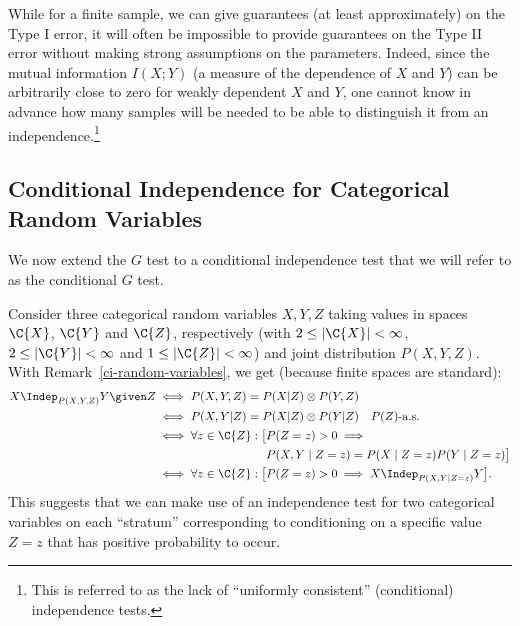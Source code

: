 While for a finite sample, we can give guarantees (at least approximately) on the Type I error, it will often be
impossible to provide guarantees on the Type II error without making strong
assumptions on the parameters. Indeed, since the mutual information $I(X;Y)$ (a measure of
the dependence of $X$ and $Y$) can be arbitrarily close to zero for weakly dependent $X$ 
and $Y$, one cannot know in advance how many samples will be needed to be able to distinguish
it from an independence.\footnote{This is referred to as the lack of ``uniformly consistent''
(conditional) independence tests.}

\subsection{Conditional Independence for Categorical Random Variables}

We now extend the $G$ test to a conditional independence test that we will refer to as the conditional $G$ test.

Consider three categorical random variables $X,Y,Z$ taking values in spaces $\C{X}$, $\C{Y}$
and $\C{Z}$, respectively (with $2 \le |\C{X}| < \infty$, $2 \le |\C{Y}| < \infty$ and $1 \le |\C{Z}| < \infty$) and joint distribution $P(X,Y,Z)$.
With Remark~\ref{ci-random-variables}, we get (because finite spaces are standard):
\begin{equation*}\begin{split}
  X \Indep_{P(X,Y,Z)} Y \given Z 
  & \iff P(X,Y,Z) = P(X | Z) \otimes P(Y,Z) \\
  & \iff P(X,Y | Z) = P(X | Z) \otimes P(Y | Z) \quad \text{$P(Z)$-a.s.} \\
  & \begin{split}
    {} \iff \forall z \in \C{Z}: \big[ & P(Z=z) > 0 \implies \\
    & P(X,Y \mid Z=z) = P(X \mid Z=z) P(Y \mid Z=z) \big]
  \end{split} \\
  & \iff \forall z \in \C{Z}: \big[P(Z=z) > 0 \implies X \Indep_{P(X,Y \mid Z=z)} Y \big].
\end{split}\end{equation*}
This suggests that we can make use of an independence test for two categorical variables
on each  ``stratum'' corresponding to conditioning on a specific value $Z=z$ that has
positive probability to occur.


